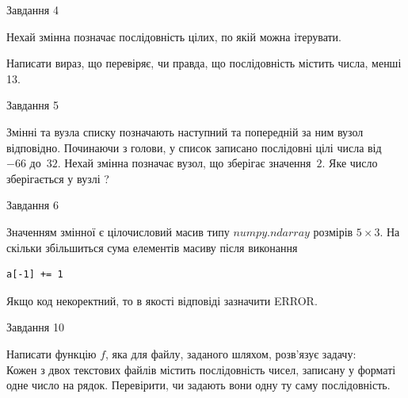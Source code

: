 \documentclass[12pt, ukrainian]{article}
\begin{document}
{\begin{minipage}[t]{8.0cm}
\begin{verbatim}
\end{verbatim}            

\end{minipage}


               
{\begin{center}Завдання {4}\end{center}}
\vspace{-4mm}
Нехай змінна  позначає послідовність цілих, по якій можна ітерувати.

Написати вираз, що перевіряє, чи правда, що послідовність  містить числа, менші 13.\par

\vspace{10mm}
               
{\begin{center}Завдання {5}\end{center}}
\vspace{-4mm}
Змінні  та  вузла списку позначають наступний та попередній за ним вузол відповідно. Починаючи з голови, у список записано послідовні цілі числа від~$-66$ до~$32$. Нехай змінна  позначає вузол, що зберігає значення~$2$.
Яке число зберігається у вузлі  ?\par

               
{\begin{center}Завдання {6}\end{center}}
\vspace{-4mm}
Значенням змінної  є цілочисловий масив типу $numpy.ndarray$ розмірів $5{\times}3$. На скільки збільшиться сума елементів масиву  після виконання
\begin{verbatim}
a[-1] += 1
\end{verbatim}


Якщо код некоректний, то в якості відповіді зазначити ERROR.\par

               
{\begin{center}Завдання {10}\end{center}}
\vspace{-4mm}

Написати функцію $f$, яка для файлу, заданого шляхом, розв’язує задачу:\\ Кожен з двох текстових файлів містить послідовність чисел, записану у форматі одне число на рядок.  Перевірити, чи задають вони одну ту саму послідовність.

}
\end{document}
